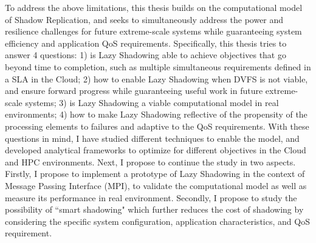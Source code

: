 To address the above limitations, this thesis builds on the computational model of Shadow Replication, and seeks to simultaneously address the power and resilience challenges for future extreme-scale systems while guaranteeing system efficiency and application QoS requirements.
Specifically, this thesis tries to answer 4 questions: 1) is Lazy Shadowing able to achieve objectives that go beyond time to completion, such as multiple simultaneous requirements defined in a SLA in the Cloud; 2) how to enable Lazy Shadowing when DVFS is not viable, and ensure forward progress while guaranteeing useful work in future extreme-scale systems; 3) is Lazy Shadowing a viable computational model in real environments; 4) how to make Lazy Shadowing reflective of the propensity of the processing elements to failures and adaptive to the QoS requirements.
With these questions in mind, 
I have studied different techniques to enable the model, and developed analytical frameworks to optimize for different objectives in the Cloud and HPC environments.
Next, I propose to continue the study in two aspects.
Firstly, I propose to implement a prototype of Lazy Shadowing in the context of Message Passing Interface (MPI), to validate the 
computational model as well as measure its performance in real environment. Secondly, I propose to study the possibility of 
``smart shadowing" which further reduces the cost of shadowing by considering the specific system configuration, application characteristics, and QoS requirement.




